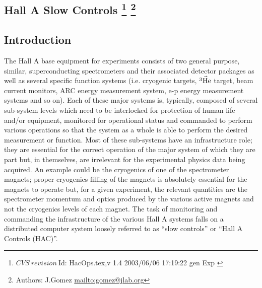 \subsection[Hall A Slow Controls]{Hall A Slow Controls
\footnote{
  $CVS~revision~ $Id: HacOps.tex,v 1.4 2003/06/06 17:19:22 gen Exp $ $
}
\footnote{Authors: J.Gomez \url{mailto:gomez@jlab.org}}
}

\subsection{Introduction}
The Hall A base equipment for experiments consists of two general purpose, 
similar, superconducting spectrometers and their associated detector packages as well as
several specific function systems (i.e. cryogenic targets, $\vec{\rm ^3He}$ target, beam current monitors,
ARC energy measurement system, e-p energy measurement systems and so on).
Each of these major systems is, typically, composed of several sub-system levels which need
to be interlocked for protection of human life and/or equipment, monitored for operational status and
commanded to perform various operations so that the system as a whole is able to perform the desired measurement
or function.
Most of these sub-systems have an infrastructure role; they are essential for the correct operation
of the major system of which they are part but, in themselves, are irrelevant for the experimental
physics data being acquired.
An example could be the cryogenics of one of the spectrometer magnets; proper cryogenics filling of the magnets
is absolutely essential for the magnets to operate but, for a given experiment, the relevant quantities are 
the spectrometer momentum and optics produced by the various active magnets and not the cryogenics
levels of each magnet.
The task of monitoring and commanding the infrastructure of the various Hall A systems
falls on a distributed computer system loosely referred to as ``slow controls'' or
``Hall A Controls (HAC)''. 

